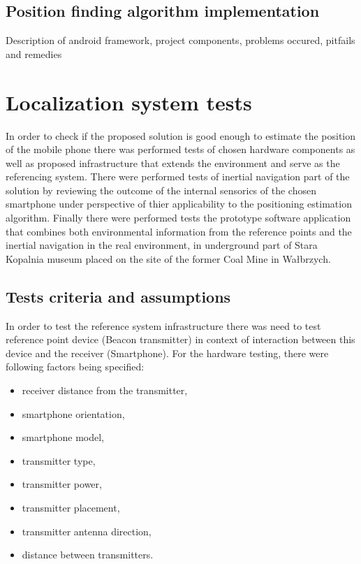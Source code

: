 \documentclass[../main.tex]{subfiles}
\begin{document}
\section{Position finding algorithm implementation} %
\label{sec:simple_position_finding_algorithm_implementation}

Description of android framework, project components, problems occured, pitfails and remedies

\chapter{Localization system tests}

In order to check if the proposed solution is good enough to estimate the position of the mobile phone there was performed tests of chosen hardware components as well as proposed infrastructure that extends the environment and serve as the referencing system. There were performed tests of inertial navigation part of the solution by reviewing the outcome of the internal sensorics of the chosen smartphone under perspective of thier applicability to the positioning estimation algorithm. Finally there were performed tests the prototype software application that combines both environmental information from the reference points and the inertial navigation in the real environment, in underground part of Stara Kopalnia museum placed on the site of the former Coal Mine in Wałbrzych.

\section{Tests criteria and assumptions} %
\label{sec:tests_criteria_and_assumptions}

In order to test the reference system infrastructure there was need to test reference point device (Beacon transmitter) in context of interaction between this device and the receiver (Smartphone). For the hardware testing, there were following factors being specified:
\begin{itemize}
	\item receiver distance from the transmitter,
	\item smartphone orientation,
	\item smartphone model,
	\item transmitter type,
	\item transmitter power,
	\item transmitter placement,
	\item transmitter antenna direction,
	\item distance between transmitters.
\end{itemize}
\end{document}
